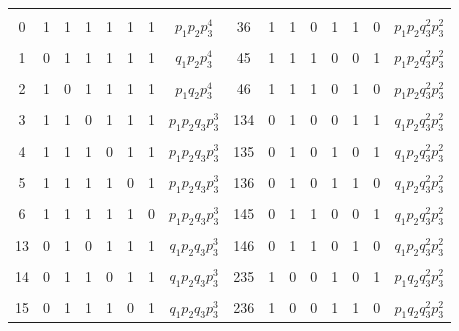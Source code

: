 \begin{table}[b]
\begin{center}
\begin{tabular}{|c|c|c|c|c|c|c|c|c|c|c|c|c|c|c|c|}
&&&&&&&&&&&&&&&\\[-9pt]

\hphantom{9}0&1&1&1&1&1&1&$p_1p_2p_3^4$&\hphantom{9}36&1&1&0&1&1&0&$p_1p_2q_3^2p_3^2$\\

&&&&&&&&&&&&&&&\\[-9pt]

\hphantom{9}1&0&1&1&1&1&1&$q_1p_2p_3^4$&\hphantom{9}45&1&1&1&0&0&1&$p_1p_2q_3^2p_3^2$\\

&&&&&&&&&&&&&&&\\[-9pt]

\hphantom{9}2&1&0&1&1&1&1&$p_1q_2p_3^4$&\hphantom{9}46&1&1&1&0&1&0&$p_1p_2q_3^2p_3^2$\\

&&&&&&&&&&&&&&&\\[-9pt]

\hphantom{9}3&1&1&0&1&1&1&$p_1p_2q_3p_3^3$&134&0&1&0&0&1&1&$q_1p_2q_3^2p_3^2$\\

&&&&&&&&&&&&&&&\\[-9pt]

\hphantom{9}4&1&1&1&0&1&1&$p_1p_2q_3p_3^3$&135&0&1&0&1&0&1&$q_1p_2q_3^2p_3^2$\\

&&&&&&&&&&&&&&&\\[-9pt]

\hphantom{9}5&1&1&1&1&0&1&$p_1p_2q_3p_3^3$&136&0&1&0&1&1&0&$q_1p_2q_3^2p_3^2$\\

&&&&&&&&&&&&&&&\\[-9pt]

\hphantom{9}6&1&1&1&1&1&0&$p_1p_2q_3p_3^3$&145&0&1&1&0&0&1&$q_1p_2q_3^2p_3^2$\\

&&&&&&&&&&&&&&&\\[-9pt]

13&0&1&0&1&1&1&$q_1p_2q_3p_3^3$&146&0&1&1&0&1&0&$q_1p_2q_3^2p_3^2$\\

&&&&&&&&&&&&&&&\\[-9pt]

14&0&1&1&0&1&1&$q_1p_2q_3p_3^3$&235&1&0&0& 1&0& 1&$p_1q_2q_3^2p_3^2$\\

&&&&&&&&&&&&&&&\\[-9pt]

15&0&1&1&1&0&1&$q_1p_2q_3p_3^3$&236&1&0&0&1 & 1&0&$p_1q_2q_3^2p_3^2$\\


\end{tabular}
\end{center}
\end{table}
